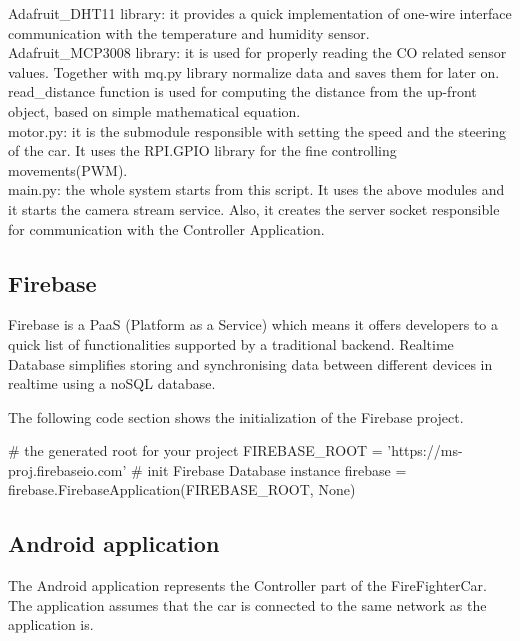 \documentclass[a4paper,11pt]{article}
\begin{document}
Adafruit\_DHT11 library: it provides a quick implementation of one-wire interface communication with the temperature and humidity sensor.\\

Adafruit\_MCP3008 library: it is used for properly reading the CO related sensor values. Together with mq.py library normalize data and saves them for later on.\\

read\_distance function is used for computing the distance from the up-front object, based on simple mathematical equation.\\

motor.py: it is the submodule responsible with setting the speed and the steering of the car. It uses the RPI.GPIO library for the fine controlling movements(PWM).\\

main.py: the whole system starts from this script. It uses the above modules and it starts the camera stream service. Also, it creates the server socket responsible for communication with the Controller Application.\\

\subsection{Firebase}
Firebase is a PaaS (Platform as a Service) which means it offers developers to a quick list of functionalities supported by a traditional backend.
Realtime Database simplifies storing and synchronising data between different devices in realtime using a noSQL database.

The following code section shows the initialization of the Firebase project.

\begin{python}
# the generated root for your project
FIREBASE_ROOT = 'https://ms-proj.firebaseio.com'
# init Firebase Database instance
firebase = firebase.FirebaseApplication(FIREBASE_ROOT, None)
\end{python}

\subsection{Android application}
The Android application represents the Controller part of the FireFighterCar. The application assumes that the car is connected to the same network as the application is.\\
\end{document}
